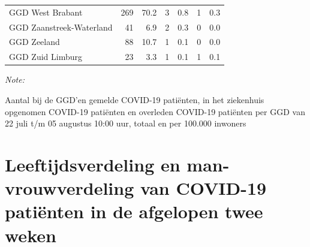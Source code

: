 \documentclass[
  english,
  man,floatsintext]{apa6}
\begin{document}
\begin{table}[H]
\begin{threeparttable}
\begin{tabular}{lrrrrrr}
GGD West Brabant & 269 & 70.2 & 3 & 0.8 & 1 & 0.3\\
GGD Zaanstreek-Waterland & 41 & 6.9 & 2 & 0.3 & 0 & 0.0\\
GGD Zeeland & 88 & 10.7 & 1 & 0.1 & 0 & 0.0\\
GGD Zuid Limburg & 23 & 3.3 & 1 & 0.1 & 1 & 0.1\\
\bottomrule
\end{tabular}
\begin{tablenotes}
\item \textit{Note: } 
\item Aantal bij de GGD’en gemelde COVID-19 patiënten, in het ziekenhuis opgenomen COVID-19 patiënten en overleden COVID-19 patiënten per GGD van 22 juli t/m 05 augustus 10:00 uur, totaal en per 100.000 inwoners
\end{tablenotes}
\end{threeparttable}
\endgroup{}
\end{table}

\newpage

\hypertarget{leeftijdsverdeling-en-man-vrouwverdeling-van-covid-19-patiuxebnten-in-de-afgelopen-twee-weken}{%
\section{Leeftijdsverdeling en man-vrouwverdeling van COVID-19 patiënten in de afgelopen twee weken}\label{leeftijdsverdeling-en-man-vrouwverdeling-van-covid-19-patiuxebnten-in-de-afgelopen-twee-weken}}
\end{document}
